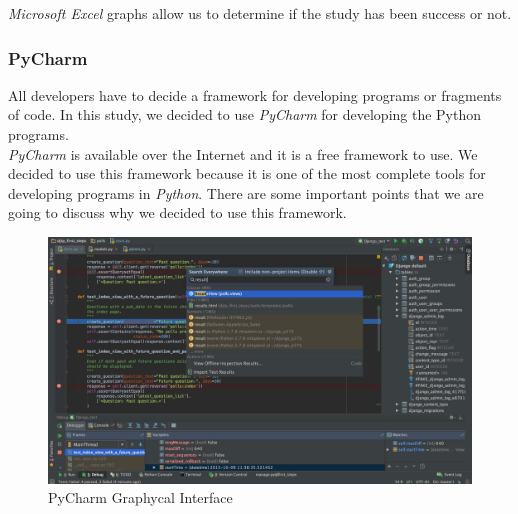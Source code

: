 \textit{Microsoft Excel} graphs allow us to determine if the study has been success or not.

\subsubsection{PyCharm}

All developers have to decide a framework for developing programs or fragments of code. In this study, we decided to use \textit{PyCharm} for developing the Python programs.\\

\textit{PyCharm} is available over the Internet and it is a free framework to use. We decided to use this framework because it is one of the most complete tools for developing programs in \textit{Python}. There are some important points that we are going to discuss why we decided to use this framework.

\begin{figure}[H]
\begin{centering}
\includegraphics[scale=0.15]{IMGS/PYCHARM.jpg}
\caption{PyCharm Graphycal Interface \label{PYCHARM}}
\end{centering}
\end{figure}

